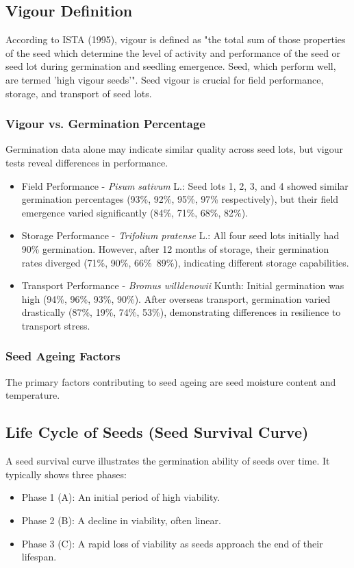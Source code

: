 \subsection{Vigour Definition} 
According to ISTA (1995), vigour is defined as "the total sum of those properties of the seed which determine the level of activity and performance of the seed or seed lot during germination and seedling emergence. Seed, which perform well, are termed ’high vigour seeds’". Seed vigour is crucial for field performance, storage, and transport of seed lots.

\subsubsection{Vigour vs. Germination Percentage} 
Germination data alone may indicate similar quality across seed lots, but vigour tests reveal differences in performance. 

\begin{itemize} 
    \item Field Performance - \textit{Pisum sativum} L.: Seed lots 1, 2, 3, and 4 showed similar germination percentages (93\%, 92\%, 95\%, 97\% respectively), but their field emergence varied significantly (84\%, 71\%, 68\%, 82\%). 
    \item Storage Performance - \textit{Trifolium pratense} L.: All four seed lots initially had 90\% germination. However, after 12 months of storage, their germination rates diverged (71\%, 90\%, 66\%\, 89\%), indicating different storage capabilities. 
    \item Transport Performance - \textit{Bromus willdenowii} Kunth: Initial germination was high (94\%, 96\%, 93\%, 90\%). After overseas transport, germination varied drastically (87\%, 19\%, 74\%, 53\%), demonstrating differences in resilience to transport stress. 
\end{itemize}

\subsubsection{Seed Ageing Factors} 
The primary factors contributing to seed ageing are seed moisture content and temperature.

\subsection{Life Cycle of Seeds (Seed Survival Curve)} 
A seed survival curve illustrates the germination ability of seeds over time. It typically shows three phases: 
\begin{itemize} 
    \item Phase 1 (A): An initial period of high viability. 
    \item Phase 2 (B): A decline in viability, often linear. 
    \item Phase 3 (C): A rapid loss of viability as seeds approach the end of their lifespan. 
\end{itemize} 

